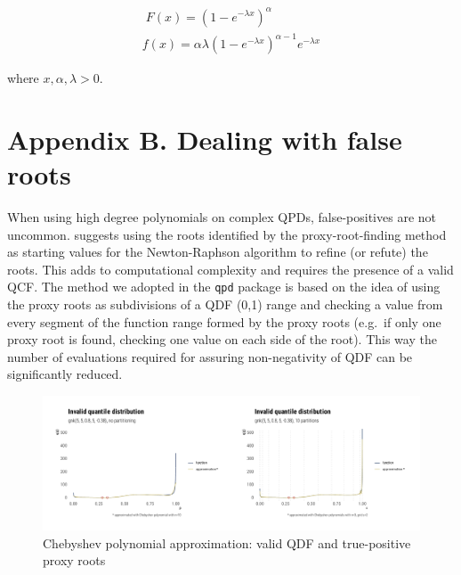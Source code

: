 \documentclass[
  12pt,
]{article}
\begin{document}
\[
\begin{gathered}\;
F(x)=(1-e^{-\lambda x})^\alpha \\
f(x)=\alpha\lambda(1-e^{-\lambda x})^{\alpha-1}e^{-\lambda x}
\end{gathered}
\]

where \(x, \alpha, \lambda>0\).

\hypertarget{appendix-b.-dealing-with-false-roots}{%
\section*{Appendix B. Dealing with false roots}\label{appendix-b.-dealing-with-false-roots}}

When using high degree polynomials on complex QPDs, false-positives are not uncommon. \citet{boyd2006ComputingRealRoots} suggests using the roots identified by the proxy-root-finding method as starting values for the Newton-Raphson algorithm to refine (or refute) the roots. This adds to computational complexity and requires the presence of a valid QCF. The method we adopted in the \texttt{qpd} package is based on the idea of using the proxy roots as subdivisions of a QDF (0,1) range and checking a value from every segment of the function range formed by the proxy roots (e.g.~if only one proxy root is found, checking one value on each side of the root). This way the number of evaluations required for assuring non-negativity of QDF can be significantly reduced.

\begin{figure}

{\centering \includegraphics{ilbm_article_files/figure-latex/chebyshev-roots-gnk-graph-1} 

}

\caption{Chebyshev polynomial approximation: valid QDF and true-positive proxy roots}\label{fig:chebyshev-roots-gnk-graph}
\end{figure}
\end{document}
